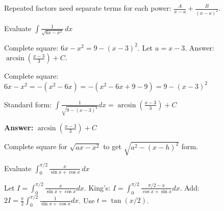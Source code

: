 \begin{takeaways}
Repeated factors need separate terms for each power: $\frac{A}{x-a} + \frac{B}{(x-a)^2}$.
\end{takeaways}

\vspace{1cm}

\begin{problem}
Evaluate $\displaystyle \int \frac{1}{\sqrt{6x - x^2}} \, dx$
\end{problem}

\begin{hint}
Complete square: $6x - x^2 = 9 - (x-3)^2$. Let $u = x-3$. Answer: $\arcsin\left(\frac{x-3}{3}\right) + C$.
\end{hint}

\begin{solution}
Complete square: $6x-x^2 = -(x^2-6x) = -(x^2-6x+9-9) = 9-(x-3)^2$

Standard form: $\displaystyle \int\frac{1}{\sqrt{9-(x-3)^2}}dx = \arcsin\left(\frac{x-3}{3}\right) + C$

\textbf{Answer:} $\boxed{\arcsin\left(\frac{x-3}{3}\right) + C}$
\end{solution}

\begin{takeaways}
Complete square for $\sqrt{ax-x^2}$ to get $\sqrt{a^2-(x-h)^2}$ form.
\end{takeaways}

\vspace{1cm}

\begin{problem}
Evaluate $\displaystyle \int_0^{\pi/2} \frac{x}{\sin x + \cos x} \, dx$
\end{problem}

\begin{hint}
Let $I = \int_0^{\pi/2} \frac{x}{\sin x + \cos x}dx$. King's: $I = \int_0^{\pi/2} \frac{\pi/2 - x}{\cos x + \sin x}dx$. Add: $2I = \frac{\pi}{2}\int_0^{\pi/2}\frac{1}{\sin x + \cos x}dx$. Use $t = \tan(x/2)$.
\end{hint}

